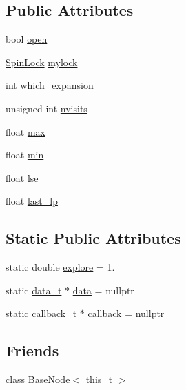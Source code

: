 \subsection*{Public Attributes}
\begin{DoxyCompactItemize}
\item 
bool \hyperlink{class_full_m_c_t_s_node_af466655cdc4433eaf1eb50e7760a158b}{open}
\item 
\hyperlink{class_spin_lock}{Spin\+Lock} \hyperlink{class_full_m_c_t_s_node_abb1ad60d6f9293ff75aa708dc0fe1ceb}{mylock}
\item 
int \hyperlink{class_full_m_c_t_s_node_a38dbbdf92a3873792d8e0625bedf7907}{which\+\_\+expansion}
\item 
unsigned int \hyperlink{class_full_m_c_t_s_node_ae7f1126893f5c6efe675d51f67db6003}{nvisits}
\item 
float \hyperlink{class_full_m_c_t_s_node_ad3d15e6577534461b574f3f6305a1727}{max}
\item 
float \hyperlink{class_full_m_c_t_s_node_a22e1cc7671e5ed2091ac4623e45f4723}{min}
\item 
float \hyperlink{class_full_m_c_t_s_node_a9bf1a9e08377dbf41965a94f1d36575a}{lse}
\item 
float \hyperlink{class_full_m_c_t_s_node_a35fe0f5a86059bd1041151dbe982d649}{last\+\_\+lp}
\end{DoxyCompactItemize}
\subsection*{Static Public Attributes}
\begin{DoxyCompactItemize}
\item 
static double \hyperlink{class_full_m_c_t_s_node_a4f2a0854002ca86dc0917487ba75a273}{explore} = 1.
\item 
static \hyperlink{class_full_m_c_t_s_node_aeb23fb7cb05ca5e9af33a43054f79574}{data\+\_\+t} $\ast$ \hyperlink{class_full_m_c_t_s_node_a77c852db32724d86ad449eb08a9a1e83}{data} = nullptr
\item 
static callback\+\_\+t $\ast$ \hyperlink{class_full_m_c_t_s_node_a9bba77400c22c878cb3f015f8ad97613}{callback} = nullptr
\end{DoxyCompactItemize}
\subsection*{Friends}
\begin{DoxyCompactItemize}
\item 
class \hyperlink{class_full_m_c_t_s_node_adf841553d0233d2421a8187d9226b7be}{Base\+Node$<$ this\+\_\+t $>$}
\end{DoxyCompactItemize}
